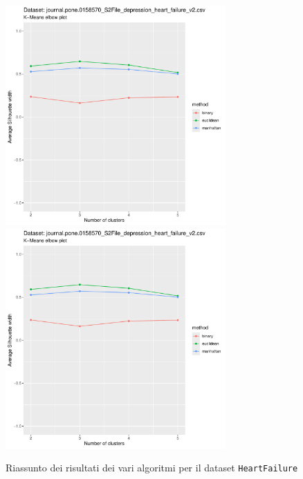 \documentclass[a4paper, 12pt]{report}
\begin{document}
			\begin{figure}[H]
				\centering
				\includegraphics[width = 0.75\textwidth, height = 0.45\textheight, page = 9]{
					results/results_HeartFailure.csv.pdf
				}
				\includegraphics[width = 0.75\textwidth, height = 0.45\textheight, page = 10]{
					results/results_HeartFailure.csv.pdf
				}
				\caption{Riassunto dei risultati dei vari algoritmi per il dataset
				\texttt{HeartFailure}}
				\label{fig:comp1}
			\end{figure}
\end{document}
